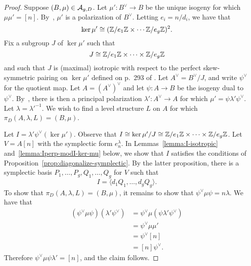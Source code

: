 \documentclass{amsart}
\begin{document}
\begin{proof}
  Suppose $(B,\mu) \in \mathcal{A}_{g,{D}}$. Let $\mu': B^\vee \to B$ be the unique isogeny for which $\mu\mu' = [n]$. By~\cite[Theorem 2.1]{birkenhake-lange-2003}, $\mu'$ is a polarization of $B^\vee$. Letting $e_i = n/d_i$, we have that
\[
  \ker \mu' \cong (\mathbb{Z}/e_1\mathbb{Z} \times \cdots \mathbb{Z}/e_g\mathbb{Z})^2.
\]
  Fix a subgroup $J$ of $\ker \mu'$ such that $$J \cong  \mathbb{Z}/e_1 \mathbb{Z} \times \cdots \times \mathbb{Z}/e_g \mathbb{Z}$$ and such that
 $J$ is (maximal) isotropic with respect to the perfect skew-symmetric pairing %
  on $\ker \mu'$ defined on p.~293 of \cite{mumford1966}.
  Let $A^\vee = B^\vee/J$, and write $\psi^\vee$ for the quotient map. Let $A = (A^\vee)^\vee$ and let $\psi: A \to B$ be the isogeny dual to $\psi^\vee$. By~\cite[Prop.~1]{mumford1966}, there is then a principal polarization $\lambda': A^\vee \to A$ for which $\mu' = \psi\lambda'\psi^\vee$. Let $\lambda = \lambda'^{-1}$. We wish to find a level structure $L$ on $A$ for which $\pi_D(A,\lambda,L) = (B,\mu)$.

  Let $I = \lambda'\psi^\vee(\ker \mu')$. Observe that $I \cong \ker \mu'/J \cong \mathbb{Z}/e_1\mathbb{Z} \times \cdots \times \mathbb{Z}/e_g\mathbb{Z}$. Let $V = A[n]$ with the symplectic form $e_n^\lambda$. In Lemmas~\ref{lemma:I-isotropic} and~\ref{lemma:Iperp-modI-ker-mu} below, we show that $I$ satisfies the conditions of Proposition~\ref{prop:diagonalize-symplectic}. By the latter proposition, there is a symplectic basis $P_1, \ldots, P_g, Q_1, \ldots, Q_g$ for $V$ such that
  \[
    I= \langle d_1 Q_1, \ldots, d_g Q_g \rangle.
  \]
  To show that $\pi_D(A,\lambda,L) = (B,\mu)$, it remains to show that $\psi^\vee\mu\psi = n\lambda$. We have that
  \begin{align*}
    (\psi^\vee\mu\psi)(\lambda'\psi^\vee) &= \psi^\vee\mu(\psi\lambda'\psi^\vee) \\
                                     &= \psi^\vee\mu\mu' \\
                                     &= \psi^\vee[n] \\
                                     &= [n]\psi^\vee.
  \end{align*}
  Therefore $\psi^\vee\mu\psi\lambda' = [n]$, and the claim follows.
\end{proof}
\end{document}
